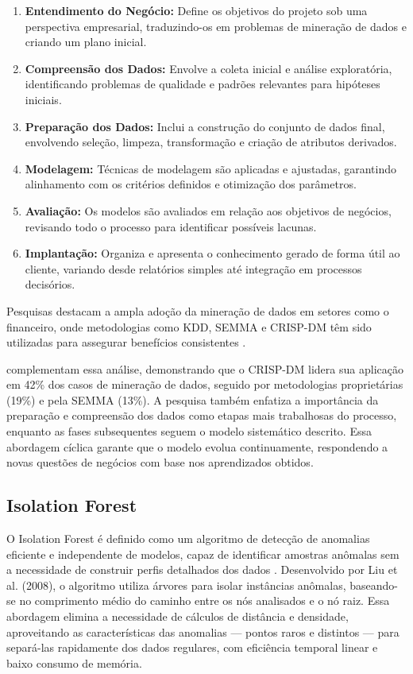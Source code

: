 \documentclass[12pt,a4paper]{article}
\begin{document}
\begin{enumerate}
    \item \textbf{Entendimento do Negócio:} Define os objetivos do projeto sob uma perspectiva empresarial, traduzindo-os em problemas de mineração de dados e criando um plano inicial.
    \item \textbf{Compreensão dos Dados:} Envolve a coleta inicial e análise exploratória, identificando problemas de qualidade e padrões relevantes para hipóteses iniciais.
    \item \textbf{Preparação dos Dados:} Inclui a construção do conjunto de dados final, envolvendo seleção, limpeza, transformação e criação de atributos derivados.
    \item \textbf{Modelagem:} Técnicas de modelagem são aplicadas e ajustadas, garantindo alinhamento com os critérios definidos e otimização dos parâmetros.
    \item \textbf{Avaliação:} Os modelos são avaliados em relação aos objetivos de negócios, revisando todo o processo para identificar possíveis lacunas.
    \item \textbf{Implantação:} Organiza e apresenta o conhecimento gerado de forma útil ao cliente, variando desde relatórios simples até integração em processos decisórios.
\end{enumerate}

Pesquisas destacam a ampla adoção da mineração de dados em setores como o financeiro, onde metodologias como KDD, SEMMA e CRISP-DM têm sido utilizadas para assegurar benefícios consistentes \cite{plotnikova2022}.

\cite{brzozowska2023} complementam essa análise, demonstrando que o CRISP-DM lidera sua aplicação em 42\% dos casos de mineração de dados, seguido por metodologias proprietárias (19\%) e pela SEMMA (13\%). A pesquisa também enfatiza a importância da preparação e compreensão dos dados como etapas mais trabalhosas do processo, enquanto as fases subsequentes seguem o modelo sistemático descrito. Essa abordagem cíclica garante que o modelo evolua continuamente, respondendo a novas questões de negócios com base nos aprendizados obtidos.

\subsection{Isolation Forest}

O Isolation Forest é definido como um algoritmo de detecção de anomalias eficiente e independente de modelos, capaz de identificar amostras anômalas sem a necessidade de construir perfis detalhados dos dados \cite{chen2023}. Desenvolvido por Liu et al. (2008), o algoritmo utiliza árvores para isolar instâncias anômalas, baseando-se no comprimento médio do caminho entre os nós analisados e o nó raiz. Essa abordagem elimina a necessidade de cálculos de distância e densidade, aproveitando as características das anomalias — pontos raros e distintos — para separá-las rapidamente dos dados regulares, com eficiência temporal linear e baixo consumo de memória.
\end{document}
